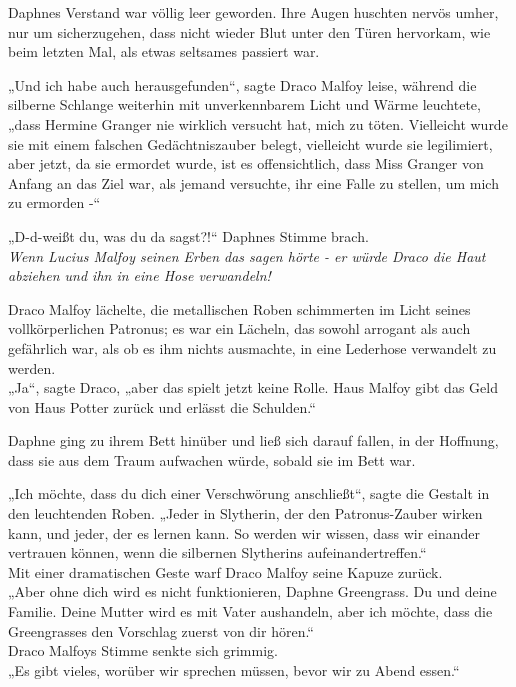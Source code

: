 {Daphnes Verstand war völlig leer geworden. Ihre Augen huschten nervös umher, nur um sicherzugehen, dass nicht wieder Blut unter den Türen hervorkam, wie beim letzten Mal, als etwas seltsames passiert war.

„Und ich habe auch herausgefunden“, sagte Draco Malfoy leise, während die silberne Schlange weiterhin mit unverkennbarem Licht und Wärme leuchtete, „dass Hermine Granger nie wirklich versucht hat, mich zu töten. Vielleicht wurde sie mit einem falschen Gedächtniszauber belegt, vielleicht wurde sie legilimiert, aber jetzt, da sie ermordet wurde, ist es offensichtlich, dass Miss Granger von Anfang an das Ziel war, als jemand versuchte, ihr eine Falle zu stellen, um mich zu ermorden -“

„D-d-weißt du, was du da sagst?!“ Daphnes Stimme brach.\\ \emph{Wenn Lucius Malfoy seinen Erben das sagen hörte - er würde Draco die Haut abziehen und ihn in eine Hose verwandeln!}

Draco Malfoy lächelte, die metallischen Roben schimmerten im Licht seines vollkörperlichen Patronus; es war ein Lächeln, das sowohl arrogant als auch gefährlich war, als ob es ihm nichts ausmachte, in eine Lederhose verwandelt zu werden.\\ „Ja“, sagte Draco, „aber das spielt jetzt keine Rolle. Haus Malfoy gibt das Geld von Haus Potter zurück und erlässt die Schulden.“

Daphne ging zu ihrem Bett hinüber und ließ sich darauf fallen, in der Hoffnung, dass sie aus dem Traum aufwachen würde, sobald sie im Bett war.

„Ich möchte, dass du dich einer Verschwörung anschließt“, sagte die Gestalt in den leuchtenden Roben. „Jeder in Slytherin, der den Patronus-Zauber wirken kann, und jeder, der es lernen kann. So werden wir wissen, dass wir einander vertrauen können, wenn die silbernen Slytherins aufeinandertreffen.“\\ Mit einer dramatischen Geste warf Draco Malfoy seine Kapuze zurück.\\ „Aber ohne dich wird es nicht funktionieren, Daphne Greengrass. Du und deine Familie. Deine Mutter wird es mit Vater aushandeln, aber ich möchte, dass die Greengrasses den Vorschlag zuerst von dir hören.“\\ Draco Malfoys Stimme senkte sich grimmig.\\ „Es gibt vieles, worüber wir sprechen müssen, bevor wir zu Abend essen.“

}
